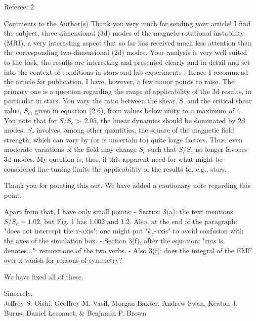 \documentclass[letterpaper, 12pt]{article}
\newenvironment{review}{\vspace{1em}\begin{leftbar}}{\end{leftbar}}
\begin{document}
\begin{review}
Referee: 2

Comments to the Author(s)
Thank you very much for sending your article! I find the subject, three-dimensional (3d) modes of the magneto-rotational instability (MRI), a very interesting aspect that so far has received much less attention than the corresponding two-dimensional (2d) modes. Your analysis is very well suited to the task, the results are interesting and presented clearly and in detail and set into the context of conditions in stars and lab experiments . Hence I recommend the article for publication. I have, however, a few minor points to
raise. The primary one is a question regarding the range of applicability of the 3d results, in particular in stars. You vary the ratio between the shear, S, and the critical shear value, $S_c$, given in equation (2.6), from values below unity to a maximum of 4. You note that for $S/S_c >~ 2.05$, the linear dynamics should be dominated by 2d
modes. $S_c$ involves, among other quantities, the square of the magnetic field strength, which can vary by (or is uncertain to) quite large factors. Thus, even moderate variations of the field may change $S_c$ such that $S/S_c$ no longer favours 3d modes. My question is, thus, if this apparent need for what might be considered fine-tuning limits the applicability of the results to, e.g., stars.
\end{review}
Thank you for pointing this out. We have added a cautionary note regarding this point.


\begin{review}
Apart from that, I have only small points:
- Section 3(a): the text mentions $S/S_c = 1.02$, but Fig. 1 has 1.002 and 1.2. Also, at the end of the paragraph: "does not intercept the x-axis"; one might put "$k_z$-axis" to avoid confusion with the axes of the simulation box.
- Section 3(f), after the equation: "rms is denotes...": remove one of the two verbs.
- Also 3(f): does the integral of the EMF over x vanish for reasons of symmetry?
\end{review}

We have fixed all of these.

\vspace{1em}

Sincerely, \\
Jeffrey S. Oishi, Geoffrey M. Vasil, Morgan Baxter, Andrew Swan, Keaton J. Burns, Daniel Lecoanet, \& Benjamin P. Brown
\end{document}
